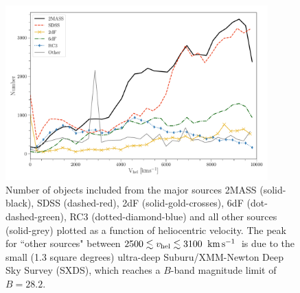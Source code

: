 \documentclass[twocolumn,tighten]{aastex62}
\newcommand{\kms}{$\rm km\, s^{-1}$}
\begin{document}
\begin{figure}[ht!]
        \centering
        \vspace{0pt}
        \includegraphics[width=0.9\textwidth]{hist_by_survey8_filtered_0only.pdf}
        \caption{\small{Number of objects included from the major sources 2MASS (solid-black), SDSS (dashed-red), 2dF (solid-gold-crosses), 6dF (dot-dashed-green), RC3 (dotted-diamond-blue) and all other sources (solid-grey) plotted as a function of heliocentric velocity. The peak for ``other sources" between $2500 \lesssim v_{\rm hel} \lesssim 3100$ \kms~is due to the small (1.3 square degrees) ultra-deep Suburu/XMM-Newton Deep Sky Survey (SXDS), which reaches a $B$-band magnitude limit of $B=28.2$.}}
        \vspace{5pt}
        \label{source_histograms}
\end{figure} 


\end{document}
